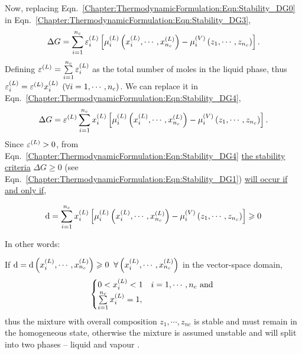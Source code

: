 Now, replacing Eqn.~\ref{Chapter:ThermodynamicFormulation:Eqn:Stability_DG0} in Eqn.~\ref{Chapter:ThermodynamicFormulation:Eqn:Stability_DG3},
\begin{equation}
    \Delta G = \summation_{i=1}^{n_{c}} \mfr[\varepsilon]{i}{L}\left[\mfr[\mu]{i}{L}\left(\mfr[x]{i}{L}, \cdots, \mfr[x]{n_{c}}{L}\right) - \mfr[\mu]{i}{V}\left(z_{1}, \cdots, z_{n_{c}}\right)\right].\label{Chapter:ThermodynamicFormulation:Eqn:Stability_DG4}
\end{equation}
Defining $\mfr[\varepsilon]{}{L} = \summation_{i=1}^{n_{c}}\mfr[\varepsilon]{i}{L}$ as the total number of moles in the liquid phase, thus $\mfr[\varepsilon]{i}{L} = \mfr[\varepsilon]{}{L} \mfr[x]{i}{L}\;\left(\forall i=1, \cdots, n_{c}\right)$. We can replace it in Eqn.~\ref{Chapter:ThermodynamicFormulation:Eqn:Stability_DG4},
\begin{equation}
   \Delta G = \mfr[\varepsilon]{}{L} \summation_{i=1}^{n_{c}}\mfr[x]{i}{L} \left[\mfr[\mu]{i}{L}\left(\mfr[x]{i}{L}, \cdots, \mfr[x]{n_{c}}{L}\right) - \mfr[\mu]{i}{V}\left(z_{1}, \cdots, z_{n_{c}}\right)\right].\label{Chapter:ThermodynamicFormulation:Eqn:Stability_DG4}
\end{equation}
Since $\mfr[\varepsilon]{}{L}>0$, from Eqn.~\ref{Chapter:ThermodynamicFormulation:Eqn:Stability_DG4} \underline{the stability criteria} $\Delta G \ge 0$ (see Eqn.~\ref{Chapter:ThermodynamicFormulation:Eqn:Stability_DG1}) \underline{ will occur if and only if},
\begin{shaded}
  \begin{equation}
     \d = \summation_{i=1}^{n_{c}}\mfr[x]{i}{L} \left[\mfr[\mu]{i}{L}\left(\mfr[x]{i}{L}, \cdots, \mfr[x]{n_{c}}{L}\right) - \mfr[\mu]{i}{V}\left(z_{1}, \cdots, z_{n_{c}}\right)\right] \ge 0 \label{Chapter:ThermodynamicFormulation:Eqn:Stability_Main}
  \end{equation}
\end{shaded}
In other words: 
\begin{shaded}
If $\d=\d\left(\mfr[x]{i}{L}, \cdots, \mfr[x]{n_{c}}{L}\right)\ge 0\;\;\forall\left(\mfr[x]{i}{L}, \cdots, \mfr[x]{n_{c}}{L}\right)$ in the vector-space domain,
\begin{displaymath}
   \begin{cases}
    0 < \mfr[x]{i}{L} < 1 & i=1,\cdots,n_{c} \text{ and }\\
    \summation_{i=1}^{n_{c}}\mfr[x]{i}{L} = 1,
   \end{cases}
\end{displaymath}
thus the mixture with overall composition $z_{1},\cdots,z_{n{c}}$ is stable and must remain in the homogeneous state, otherwise the mixture is assumed unstable and will split into two phases -- liquid and vapour \citep[see][for further details of stability criteria]{michelsen_2007}.
\end{shaded}

